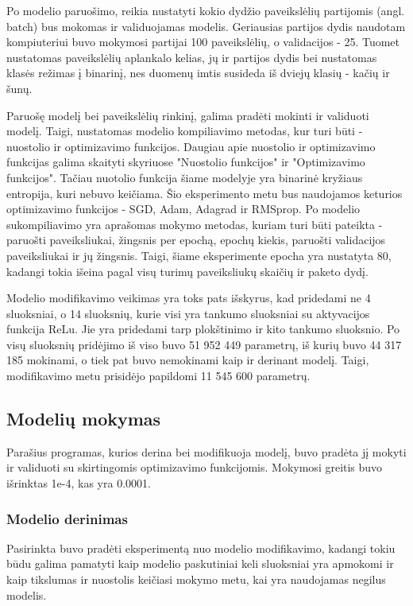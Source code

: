 \documentclass{VUMIFPSkursinis}
\begin{document}
Po modelio paruošimo, reikia nustatyti kokio dydžio paveikslėlių partijomis (angl. batch) bus mokomas ir validuojamas modelis. Geriausias partijos dydis naudotam kompiuteriui buvo mokymosi partijai 100 paveikslėlių, o validacijos - 25.
Tuomet nustatomas paveikslėlių aplankalo kelias, jų ir partijos dydis bei nustatomas klasės režimas į binarinį, nes duomenų imtis susideda iš dviejų klasių - kačių ir šunų.

Paruošę modelį bei paveikslėlių rinkinį, galima pradėti mokinti ir validuoti modelį. Taigi, nustatomas modelio kompiliavimo metodas, kur turi būti - nuostolio ir 
optimizavimo funkcijos. Daugiau apie nuostolio ir optimizavimo funkcijas galima skaityti skyriuose "Nuostolio funkcijos" ir "Optimizavimo funkcijos". Tačiau nuotolio 
funkcija šiame modelyje yra binarinė kryžiaus entropija, kuri nebuvo keičiama. Šio eksperimento metu bus naudojamos keturios optimizavimo funkcijos - SGD, 
Adam, Adagrad ir RMSprop. Po modelio sukompiliavimo yra aprašomas mokymo metodas, kuriam turi būti pateikta - paruošti paveiksliukai, žingsnis per epochą, epochų kiekis, 
paruošti validacijos paveiksliukai ir jų žingsnis. Taigi, šiame eksperimente epocha yra nustatyta 80, kadangi tokia išeina pagal visų turimų paveiksliukų skaičių ir paketo dydį.

Modelio modifikavimo veikimas yra toks pats išskyrus, kad pridedami ne 4 sluoksniai, o 14 sluoksnių, kurie visi yra tankumo sluoksniai su aktyvacijos funkcija ReLu. Jie yra 
pridedami tarp plokštinimo ir kito tankumo sluoksnio. Po visų sluoksnių pridėjimo iš viso buvo 51 952 449 parametrų, iš kurių buvo 44 317 185 mokinami, o tiek pat buvo nemokinami 
kaip ir derinant modelį. Taigi, modifikavimo metu prisidėjo papildomi 11 545 600 parametrų.

\subsection{Modelių mokymas}
Parašius programas, kurios derina bei modifikuoja modelį, buvo pradėta jį mokyti ir validuoti su skirtingomis optimizavimo funkcijomis.
Mokymosi greitis buvo išrinktas 1e-4, kas yra 0.0001.
\subsubsection{Modelio derinimas}
Pasirinkta buvo pradėti eksperimentą nuo modelio modifikavimo, kadangi tokiu būdu galima pamatyti kaip modelio paskutiniai keli sluoksniai yra apmokomi ir kaip tikslumas ir nuostolis 
keičiasi mokymo metu, kai yra naudojamas negilus modelis.
\end{document}
